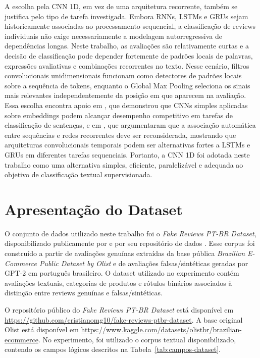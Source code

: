 \documentclass[12pt,a4paper]{article}
\begin{document}
A escolha pela CNN 1D, em vez de uma arquitetura recorrente, também se justifica pelo tipo de tarefa investigada. Embora RNNs, LSTMs e GRUs sejam historicamente associadas ao processamento sequencial, a classificação de reviews individuais não exige necessariamente a modelagem autorregressiva de dependências longas. Neste trabalho, as avaliações são relativamente curtas e a decisão de classificação pode depender fortemente de padrões locais de palavras, expressões avaliativas e combinações recorrentes no texto. Nesse cenário, filtros convolucionais unidimensionais funcionam como detectores de padrões locais sobre a sequência de tokens, enquanto o Global Max Pooling seleciona os sinais mais relevantes independentemente da posição em que aparecem na avaliação. Essa escolha encontra apoio em , que demonstrou que CNNs simples aplicadas sobre embeddings podem alcançar desempenho competitivo em tarefas de classificação de sentenças, e em , que argumentaram que a associação automática entre sequências e redes recorrentes deve ser reconsiderada, mostrando que arquiteturas convolucionais temporais podem ser alternativas fortes a LSTMs e GRUs em diferentes tarefas sequenciais. Portanto, a CNN 1D foi adotada neste trabalho como uma alternativa simples, eficiente, paralelizável e adequada ao objetivo de classificação textual supervisionada.

\section{Apresentação do Dataset}

O conjunto de dados utilizado neste trabalho foi o \textit{Fake Reviews PT-BR Dataset}, disponibilizado publicamente por  e por seu repositório de dados \cite{borges2025dataset}. Esse corpus foi construído a partir de avaliações genuínas extraídas da base pública \textit{Brazilian E-Commerce Public Dataset by Olist} \cite{olist2018dataset} e de avaliações falsas/sintéticas geradas por GPT-2 em português brasileiro. O dataset utilizado no experimento contém avaliações textuais, categorias de produtos e rótulos binários associados à distinção entre reviews genuínas e falsas/sintéticas.

O repositório público do \textit{Fake Reviews PT-BR Dataset} está disponível em \url{https://github.com/cristianomg10/fake-reviews-ptbr-dataset}. A base original Olist está disponível em \url{https://www.kaggle.com/datasets/olistbr/brazilian-ecommerce}. No experimento, foi utilizado o corpus textual disponibilizado, contendo os campos lógicos descritos na Tabela~\ref{tab:campos-dataset}.
\end{document}
